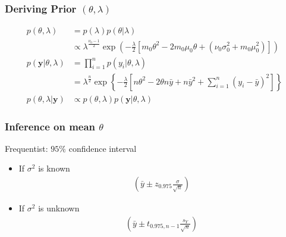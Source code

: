           \subsubsection{Deriving Prior $(\theta, \lambda)$}

          \begin{align*}
              p(\theta, \lambda) &=
              p(\lambda)p(\theta|\lambda)\\
                                 &\propto
                                 \lambda^{\frac{\nu_0-1}{2}}
                                 \exp\left(-\frac{\lambda}{2}
                                     \left[m_0\theta^2
                                         - 2m_0\mu_0\theta +
                                 (\nu_0\sigma_0^2+m_0\mu_0^2)\right]\right)\\
              p(\mathbf{y}|\theta, \lambda) &= \prod_{i=1}^n
              p(y_i|\theta, \lambda)\\ 
                                            &=
                                            \lambda^{\frac{n}{2}}\exp\left\{
                                                -\frac{\lambda}{2} \left[
                                                    n\theta^2 - 2\theta n \bar{y} +
                                                    n\bar{y}^2
                                                    + \sum_{i=1}^n (y_i - \bar{y})^2
                                                \right]
                                            \right\}\\
              p(\theta, \lambda | \mathbf{y}) &\propto
              p(\theta, \lambda)p(\mathbf{y}|\theta, \lambda)
          \end{align*}

          \subsubsection{Inference on mean $\theta$}

          Frequentist: $95\%$ confidence interval
          \begin{itemize}
              \item If $\sigma^2$ is known
              \begin{align*}
                  \left(\bar{y} \pm
                      z_{0.975}\frac{\sigma}{\sqrt{n}}\right)
              \end{align*}
          \item If $\sigma^2$ is unknown
              \begin{align*}
                  \left(\bar{y} \pm t_{0.975,
                  n-1}\frac{s_Y}{\sqrt{n}}\right)
              \end{align*}
      \end{itemize}

